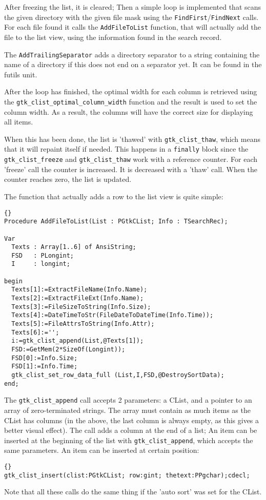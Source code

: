 \documentclass[10pt]{article}
\newcommand{\file}[1]{\textsf{#1}}
\begin{document}
After freezing the list, it is cleared; Then a simple loop is implemented
that scans the given directory with the given file mask using the
\lstinline|FindFirst|/\lstinline|FindNext| calls. For each file found
it calls the \lstinline|AddFileToList| function, that will actually add the
file to the list view, using the information found in the search record.

The \lstinline|AddTrailingSeparator| adds a directory separator to a 
string containing the name of a directory if this does not end on a 
separator yet. It can be found in the \file{futils} unit.

After the loop has finished, the optimal width for each column is 
retrieved using the \lstinline|gtk_clist_optimal_column_width| function
and the result is used to set the column width. As a result, the columns will
have the correct size for displaying all items.

When this has been done, the list is 'thawed' with \lstinline|gtk_clist_thaw|,
which means that it will repaint itself if needed. This happens in a 
\lstinline|finally| block since the \lstinline|gtk_clist_freeze| and 
\lstinline|gtk_clist_thaw| work with a reference counter. For each 'freeze' 
call the counter is increased. It is decreased with a 'thaw' call. When the
counter reaches zero, the list is updated.

The function that actually adds a row to the list view is quite simple:
\begin{lstlisting}{}
Procedure AddFileToList(List : PGtkCList; Info : TSearchRec);

Var
  Texts : Array[1..6] of AnsiString;
  FSD   : PLongint;
  I     : longint;
      
begin
  Texts[1]:=ExtractFileName(Info.Name);
  Texts[2]:=ExtractFileExt(Info.Name);
  Texts[3]:=FileSizeToString(Info.Size);
  Texts[4]:=DateTimeToStr(FileDateToDateTime(Info.Time));
  Texts[5]:=FileAttrsToString(Info.Attr);
  Texts[6]:='';
  i:=gtk_clist_append(List,@Texts[1]);
  FSD:=GetMem(2*SizeOf(Longint));
  FSD[0]:=Info.Size;
  FSD[1]:=Info.Time;
  gtk_clist_set_row_data_full (List,I,FSD,@DestroySortData);
end;
\end{lstlisting}
The \lstinline|gtk_clist_append| call accepts 2 parameters: a CList, and a
pointer to an array of zero-terminated strings. The array must contain as
much items as the CList has columns (in the above, the last column is 
always empty, as this gives a better visual effect). The call adds a column
at the end of a list; An item can be inserted at the beginning of the list
with \lstinline|gtk_clist_append|, which accepts the same parameters. An
item can be inserted at certain position:
\begin{lstlisting}{}
gtk_clist_insert(clist:PGtkCList; row:gint; thetext:PPgchar);cdecl;
\end{lstlisting}
Note that all these calls do the same thing if the 'auto sort' was set for
the CList.
\end{document}
